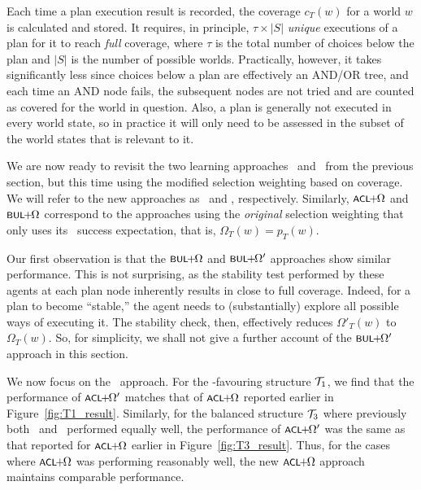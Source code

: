 Each time a plan execution result is recorded, the coverage
$c_T(w)$ for a world $w$ is calculated and stored.
It requires, in principle, $\tau \times |S|$ \emph{unique} executions of
a plan for it to reach \emph{full} coverage, where $\tau$ is the total number of
choices below the plan and $|S|$ is the number of possible worlds. Practically,
however, it takes significantly less since choices below a plan are effectively
an AND/OR tree, and each time an AND node fails, the subsequent
nodes are not tried and are counted as covered for the world in question.
Also, a plan is generally not executed in every world state, so in
practice it will only need to be assessed in the subset of the world
states that is relevant to it.






We are now ready to revisit the two learning approaches \CL\ and \BUL\
from the previous section, but this time using the modified selection weighting
based on coverage.
We will refer to the new approaches as \CLSELB\ and \BULSELB, respectively.
Similarly, $\CLSELA$ and $\BULSELA$ correspond to the approaches using the
\emph{original} selection weighting that only uses its \dt\ success
expectation, that is, $\Omega_T(w) = p_T(w)$.


Our first observation is that the $\BULSELA$ and $\BULSELB$ approaches show
similar performance.
This is not surprising, as the stability test performed by these agents at each
plan node inherently results in close to full coverage. Indeed, for a plan to
become ``stable,'' the agent needs to (substantially) explore all possible  ways
of executing it. The stability check, then, effectively reduces $\Omega'_T(w)$ to
$\Omega_T(w)$.
So, for simplicity, we shall not give a further account of the $\BULSELB$
approach in this section.



We now focus on the \CL\ approach.
For the \CL-favouring structure ${\mathcal{T}}_1$, we find that the performance of $\CLSELB$ matches that
of $\CLSELA$ reported earlier in Figure~\ref{fig:T1_result}.
Similarly, for the balanced structure ${\mathcal{T}}_3$ where previously both \CL\ and
\BUL\ performed equally well, the performance of $\CLSELB$
was the same as that reported for $\CLSELA$ earlier in Figure~\ref{fig:T3_result}.
Thus, for the cases where $\CLSELA$ was performing reasonably well, the new $\CLSELA$ approach maintains comparable performance.


